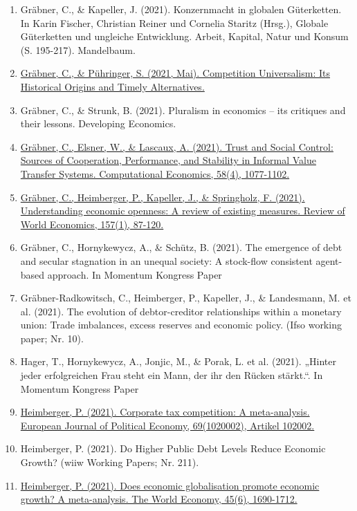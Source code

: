 \begin{enumerate}
	 \item Gräbner, C., \& Kapeller, J. (2021). Konzernmacht in globalen Güterketten. In Karin Fischer, Christian Reiner und Cornelia Staritz (Hrsg.), Globale Güterketten und ungleiche Entwicklung. Arbeit, Kapital, Natur und Konsum (S. 195-217). Mandelbaum.
	 \item \href{https://doi.org/10.2139/ssrn.3856905}{Gräbner, C., \& Pühringer, S. (2021, Mai). Competition Universalism: Its Historical Origins and Timely Alternatives.}
	 \item Gräbner, C., \& Strunk, B. (2021). Pluralism in economics – its critiques and their lessons. Developing Economics.
	 \item \href{https://doi.org/10.1007/s10614-020-09994-0}{Gräbner, C., Elsner, W., \& Lascaux, A. (2021). Trust and Social Control: Sources of Cooperation, Performance, and Stability in Informal Value Transfer Systems. Computational Economics, 58(4), 1077-1102.}
	 \item \href{https://doi.org/10.1007/s10290-020-00391-1}{Gräbner, C., Heimberger, P., Kapeller, J., \& Springholz, F. (2021). Understanding economic openness: A review of existing measures. Review of World Economics, 157(1), 87-120.}
	 \item Gräbner, C., Hornykewycz, A., \& Schütz, B. (2021). The emergence of debt and secular stagnation in an unequal society: A stock-flow consistent agent-based approach. In Momentum Kongress Paper
	 \item Gräbner-Radkowitsch, C., Heimberger, P., Kapeller, J., \& Landesmann, M. et al. (2021). The evolution of debtor-creditor relationships within a monetary union: Trade imbalances, excess reserves and economic policy. (Ifso working paper; Nr. 10).
	 \item Hager, T., Hornykewycz, A., Jonjic, M., \& Porak, L. et al. (2021). „Hinter jeder erfolgreichen Frau steht ein Mann, der ihr den Rücken stärkt.“. In Momentum Kongress Paper
	 \item \href{https://doi.org/10.1016/j.ejpoleco.2021.102002}{Heimberger, P. (2021). Corporate tax competition: A meta-analysis. European Journal of Political Economy, 69(1020002), Artikel 102002.}
	 \item Heimberger, P. (2021). Do Higher Public Debt Levels Reduce Economic Growth? (wiiw Working Papers; Nr. 211).
	 \item \href{https://doi.org/10.1111/twec.13235}{Heimberger, P. (2021). Does economic globalisation promote economic growth? A meta-analysis. The World Economy, 45(6), 1690-1712.}

\end{enumerate}
